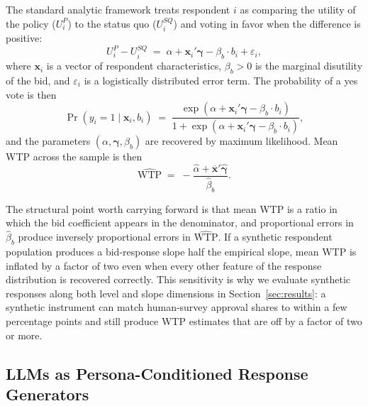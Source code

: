 \documentclass[12pt]{article}
\begin{document}
The standard analytic framework treats respondent $i$ as comparing the
utility of the policy ($U_i^P$) to the status quo ($U_i^{SQ}$) and voting
in favor when the difference is positive:
\begin{equation}
    U_i^P - U_i^{SQ} \;=\; \alpha + \mathbf{x}_i'\boldsymbol{\gamma}
    - \beta_b \cdot b_i + \varepsilon_i,
    \label{eq:bg-utility}
\end{equation}
where $\mathbf{x}_i$ is a vector of respondent characteristics, $\beta_b > 0$
is the marginal disutility of the bid, and $\varepsilon_i$ is a
logistically distributed error term. The probability of a yes vote is then
\begin{equation}
    \Pr(y_i = 1 \mid \mathbf{x}_i, b_i) \;=\;
    \frac{\exp(\alpha + \mathbf{x}_i'\boldsymbol{\gamma} - \beta_b \cdot b_i)}{1 + \exp(\alpha + \mathbf{x}_i'\boldsymbol{\gamma} - \beta_b \cdot b_i)},
    \label{eq:bg-logit}
\end{equation}
and the parameters $(\alpha, \boldsymbol{\gamma}, \beta_b)$ are recovered by
maximum likelihood. Mean WTP across the sample is then
\begin{equation}
    \widehat{\text{WTP}} \;=\;
    -\frac{\hat{\alpha} + \overline{\mathbf{x}}'\hat{\boldsymbol{\gamma}}}{\hat{\beta}_b}.
    \label{eq:bg-wtp}
\end{equation}

The structural point worth carrying forward is that mean WTP is a ratio in
which the bid coefficient appears in the denominator, and proportional
errors in $\hat{\beta}_b$ produce inversely proportional errors in
$\widehat{\text{WTP}}$. If a synthetic respondent population produces a
bid-response slope half the empirical slope, mean WTP is inflated by a
factor of two even when every other feature of the response distribution
is recovered correctly. This sensitivity is why we evaluate synthetic
responses along both level and slope dimensions in Section~\ref{sec:results}:
a synthetic instrument can match human-survey approval shares to within
a few percentage points and still produce WTP estimates that are off by
a factor of two or more.

\subsection{LLMs as Persona-Conditioned Response Generators}\label{sec:bg-llms}
\end{document}
